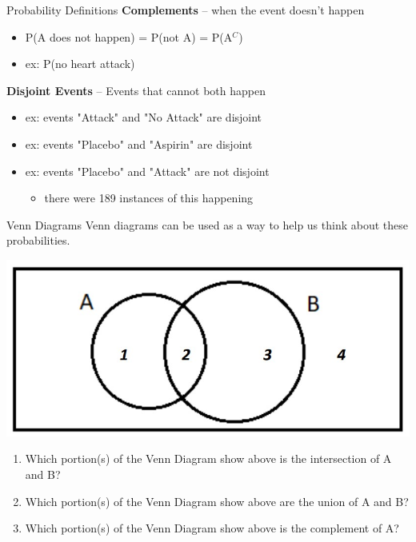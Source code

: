 \documentclass{beamer}
\begin{document}
\begin{frame}{Probability Definitions}
\textbf{Complements} -- when the event doesn't happen
\begin{itemize}
    \item P(A does not happen) = P(not A) = P(A$^C$)
    \item ex: P(no heart attack)
\end{itemize} \vspace{8mm}

\textbf{Disjoint Events} -- Events that cannot both happen
\begin{itemize}
    \item ex: events "Attack" and "No Attack" are disjoint
    \item ex: events "Placebo" and "Aspirin" are disjoint
    \item ex: events "Placebo" and "Attack" are not disjoint
        \begin{itemize}
            \item there were 189 instances of this happening
        \end{itemize}
\end{itemize}
\end{frame}

\begin{frame}{Venn Diagrams}
Venn diagrams can be used as a way to help us think about these probabilities.
\begin{center}
\includegraphics[scale=.5]{img/venn_diagram1.jpg}
\end{center}
\scriptsize{
\begin{enumerate}
    \item Which portion(s) of the Venn Diagram show above is the intersection of A and B? \vspace{4mm}
    \item Which portion(s) of the Venn Diagram show above are the union of A and B? \vspace{4mm}
    \item Which portion(s) of the Venn Diagram show above is the complement of A?
\end{enumerate}}
\end{frame}
\end{document}
